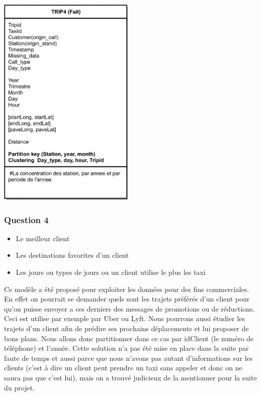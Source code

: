 \documentclass[]{report}
\begin{document}
	\begin{center}
		\includegraphics[width=65mm]{Figures/Trip4.png}
	\end{center}
	
	\subsubsection{Question 4}
	\begin{itemize}
		\item Le meilleur client
		\item Les destinations favorites d'un client
		\item Les jours ou types de jours ou un client utilise le plus les taxi
	\end{itemize}
	Ce modèle a été proposé pour exploiter les données pour des fins commerciales. En effet on pourrait se demander quels sont les trajets préférés d'un client pour qu'on puisse envoyer a ces derniers des messages de promotions ou de réductions. Ceci est utilise par exemple par Uber ou Lyft.  Nous pourrons aussi étudier les trajets d'un client afin de prédire ses prochains déplacements et lui proposer de bons plans. Nous allons donc partitionner dans ce cas par idClient (le numéro de téléphone) et l'année. Cette solution n'a pas été mise en place dans la suite par faute de temps et aussi parce que nous n'avons pas autant d'informations sur les clients (c'est à dire un client peut prendre un taxi sans appeler et donc on ne saura pas que c'est lui), mais on a trouvé judicieux de la mentionner pour la suite du projet.
	
\end{document}
